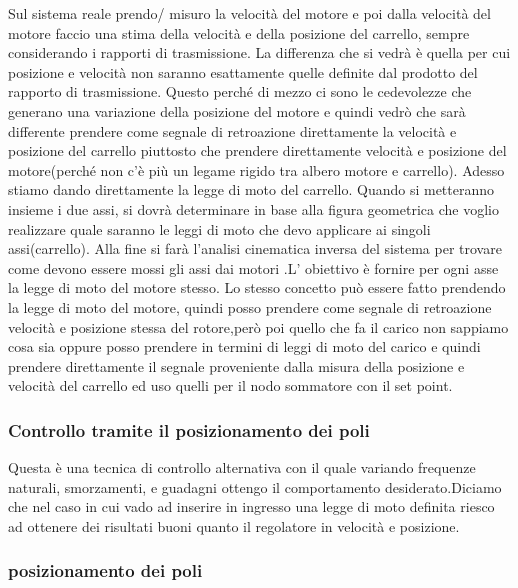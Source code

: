 \documentclass{article}
\begin{document}
Sul sistema reale prendo/ misuro la velocità del motore e poi dalla velocità del motore faccio 
una stima della velocità e della posizione del carrello, sempre considerando i rapporti di trasmissione.
La differenza che si vedrà è quella per cui posizione e velocità non saranno esattamente quelle definite dal prodotto del rapporto di trasmissione. Questo perché di mezzo ci sono
le cedevolezze che generano una variazione della posizione del motore e quindi vedrò che sarà differente prendere come segnale di retroazione direttamente la velocità e posizione del carrello piuttosto
che prendere direttamente velocità e posizione del motore(perché non c'è più un legame rigido tra albero motore e carrello).
Adesso stiamo dando direttamente la legge di moto del carrello.
Quando si metteranno insieme i due assi,  si dovrà determinare in base
alla figura geometrica che voglio realizzare quale saranno le leggi di moto che devo applicare ai singoli assi(carrello). Alla fine si farà l'analisi cinematica inversa del sistema per trovare come  devono essere mossi gli assi dai motori .L' obiettivo è fornire per ogni asse la legge 
di moto del motore stesso. Lo stesso concetto può essere fatto prendendo la legge di moto del motore, quindi posso prendere come segnale di retroazione velocità e posizione
stessa del rotore,però poi quello che fa il carico non sappiamo cosa sia oppure posso prendere in termini di leggi di moto del carico e quindi 
prendere direttamente il segnale proveniente dalla misura della posizione e velocità del carrello
ed uso quelli per il nodo sommatore con il set point.





\subsubsection{Controllo tramite il posizionamento dei poli}
Questa è una tecnica di controllo alternativa con il quale variando frequenze naturali, smorzamenti, e guadagni ottengo
il comportamento desiderato.Diciamo che nel caso in cui vado ad inserire in ingresso una legge di moto definita riesco ad ottenere dei risultati buoni quanto il regolatore in velocità e posizione.

\subsubsection{posizionamento dei poli }
\end{document}
